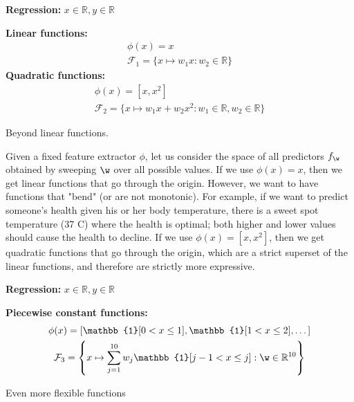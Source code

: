 
\begin{example}
	\noindent\textbf{Regression:} $x \in \mathbb{R}, y \in \mathbb{R}$

	\br

	\noindent\textbf{Linear functions:}
	\begin{gather*}		
		\phi(x)=x \\
		\mathcal{F}_1 = \{x \mapsto w_1 x: w_2 \in \mathbb{R}\}
	\end{gather*}
	\noindent\textbf{Quadratic functions:}
	\begin{gather*}
		\phi(x)=[x,x^2]\\
		\mathcal{F}_2 = \{x \mapsto w_1 x + w_2 x^2 : w_1 \in \mathbb{R}, w_2 \in \mathbb{R}\}
	\end{gather*}

	\caption{
		\label{ex:beyond}
		Beyond linear functions.
	}
\end{example}
Given a fixed feature extractor $\phi$,
let us consider the space of all predictors $f_{\w}$ obtained by sweeping $\w$ over all possible values.
% 
If we use $\phi(x) = x$, then we get linear functions that go through the origin.
However, we want to have functions that "bend" (or are not monotonic).
For example, if we want to predict someone's health given his or her body temperature,
there is a sweet spot temperature (37 C) where the health is optimal;
both higher and lower values should cause the health to decline.
% 
If we use $\phi(x) = [x, x^2]$, then we get quadratic functions that go through the origin,
which are a strict superset of the linear functions,
and therefore are strictly more expressive.


\begin{example}
	\noindent\textbf{Regression:} $x \in \mathbb{R}, y \in \mathbb{R}$

	\br

	\noindent\textbf{Piecewise constant functions:}
	\begin{gather*}
		\phi(x) = \left[\mathbb{1}[0 < x \le 1], \mathbb{1}[1 < x \le 2], \dots \right]\\
		\mathcal{F}_3 = \left\{ x \mapsto \sum_{j=1}^{10} w_j \mathbb{1}[j - 1 < x \le j] : \w \in \mathbb{R}^{10} \right\}
	\end{gather*}

	\caption{
		\label{ex:regression_pw_cont}
		Even more flexible functions
	}
\end{example}

